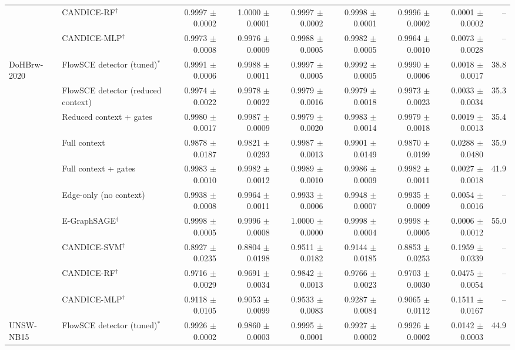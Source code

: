\begin{table}[t]
\begin{tabular}{@{}llrrrrrrr@{}}
 & CANDICE-RF$^\dagger$ & 0.9997 $\pm$ 0.0002 & 1.0000 $\pm$ 0.0001 & 0.9997 $\pm$ 0.0002 & 0.9998 $\pm$ 0.0001 & 0.9996 $\pm$ 0.0002 & 0.0001 $\pm$ 0.0002 & -- \\
 & CANDICE-MLP$^\dagger$ & 0.9973 $\pm$ 0.0008 & 0.9976 $\pm$ 0.0009 & 0.9988 $\pm$ 0.0005 & 0.9982 $\pm$ 0.0005 & 0.9964 $\pm$ 0.0010 & 0.0073 $\pm$ 0.0028 & -- \\
\midrule
DoHBrw-2020 & FlowSCE detector (tuned)$^\ast$ & 0.9991 $\pm$ 0.0006 & 0.9988 $\pm$ 0.0011 & 0.9997 $\pm$ 0.0005 & 0.9992 $\pm$ 0.0005 & 0.9990 $\pm$ 0.0006 & 0.0018 $\pm$ 0.0017 & 38.8 \\
 & FlowSCE detector (reduced context) & 0.9974 $\pm$ 0.0022 & 0.9978 $\pm$ 0.0022 & 0.9979 $\pm$ 0.0016 & 0.9979 $\pm$ 0.0018 & 0.9973 $\pm$ 0.0023 & 0.0033 $\pm$ 0.0034 & 35.3 \\
 & Reduced context + gates & 0.9980 $\pm$ 0.0017 & 0.9987 $\pm$ 0.0009 & 0.9979 $\pm$ 0.0020 & 0.9983 $\pm$ 0.0014 & 0.9979 $\pm$ 0.0018 & 0.0019 $\pm$ 0.0013 & 35.4 \\
 & Full context & 0.9878 $\pm$ 0.0187 & 0.9821 $\pm$ 0.0293 & 0.9987 $\pm$ 0.0013 & 0.9901 $\pm$ 0.0149 & 0.9870 $\pm$ 0.0199 & 0.0288 $\pm$ 0.0480 & 35.9 \\
 & Full context + gates & 0.9983 $\pm$ 0.0010 & 0.9982 $\pm$ 0.0012 & 0.9989 $\pm$ 0.0010 & 0.9986 $\pm$ 0.0009 & 0.9982 $\pm$ 0.0011 & 0.0027 $\pm$ 0.0018 & 41.9 \\
 & Edge-only (no context) & 0.9938 $\pm$ 0.0008 & 0.9964 $\pm$ 0.0011 & 0.9933 $\pm$ 0.0006 & 0.9948 $\pm$ 0.0007 & 0.9935 $\pm$ 0.0009 & 0.0054 $\pm$ 0.0016 & -- \\
 & E-GraphSAGE$^\dagger$ & 0.9998 $\pm$ 0.0005 & 0.9996 $\pm$ 0.0008 & 1.0000 $\pm$ 0.0000 & 0.9998 $\pm$ 0.0004 & 0.9998 $\pm$ 0.0005 & 0.0006 $\pm$ 0.0012 & 55.0 \\
 & CANDICE-SVM$^\dagger$ & 0.8927 $\pm$ 0.0235 & 0.8804 $\pm$ 0.0198 & 0.9511 $\pm$ 0.0182 & 0.9144 $\pm$ 0.0185 & 0.8853 $\pm$ 0.0253 & 0.1959 $\pm$ 0.0339 & -- \\
 & CANDICE-RF$^\dagger$ & 0.9716 $\pm$ 0.0029 & 0.9691 $\pm$ 0.0034 & 0.9842 $\pm$ 0.0013 & 0.9766 $\pm$ 0.0023 & 0.9703 $\pm$ 0.0030 & 0.0475 $\pm$ 0.0054 & -- \\
 & CANDICE-MLP$^\dagger$ & 0.9118 $\pm$ 0.0105 & 0.9053 $\pm$ 0.0099 & 0.9533 $\pm$ 0.0083 & 0.9287 $\pm$ 0.0084 & 0.9065 $\pm$ 0.0112 & 0.1511 $\pm$ 0.0167 & -- \\
\midrule
UNSW-NB15 & FlowSCE detector (tuned)$^\ast$ & 0.9926 $\pm$ 0.0002 & 0.9860 $\pm$ 0.0003 & 0.9995 $\pm$ 0.0001 & 0.9927 $\pm$ 0.0002 & 0.9926 $\pm$ 0.0002 & 0.0142 $\pm$ 0.0003 & 44.9 \\

\end{tabular}
\end{table}

